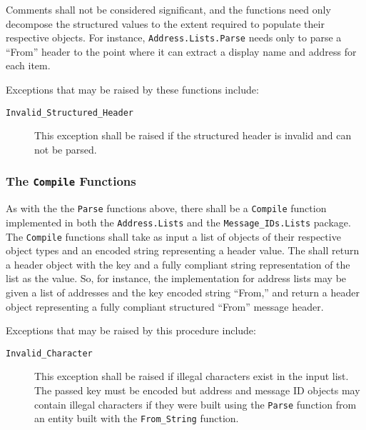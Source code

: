 \documentclass[11pt]{article}
\begin{document}
Comments shall not be considered significant, and the functions need
only decompose the structured values to the extent required to
populate their respective objects. For instance,
\texttt{Address.Lists.Parse} needs only to parse a ``From'' header to
the point where it can extract a display name and address for each
item.

Exceptions that may be raised by these functions include:

\begin{description}

\item[\texttt{Invalid\_Structured\_Header}] This exception shall be
  raised if the structured header is invalid and can not be parsed.

\end{description}

\subsubsection{The \texttt{Compile} Functions}

As with the the \texttt{Parse} functions above, there shall be a
\texttt{Compile} function implemented in both the
\texttt{Address.Lists} and the \texttt{Message\_IDs.Lists}
package. The \texttt{Compile} functions shall take as input a list of
objects of their respective object types and an encoded string
representing a header value. The shall return a header object with the
key and a fully compliant string representation of the list as the
value. So, for instance, the implementation for address lists may be
given a list of addresses and the key encoded string ``From,'' and
return a header object representing a fully compliant structured
``From'' message header.

Exceptions that may be raised by this procedure include:

\begin{description}

\item[\texttt{Invalid\_Character}] This exception shall be raised if
  illegal characters exist in the input list. The passed key must be
  encoded but address and message ID objects may contain illegal
  characters if they were built using the \texttt{Parse} function from
  an entity built with the \texttt{From\_String} function.

\end{description}

\end{document}
